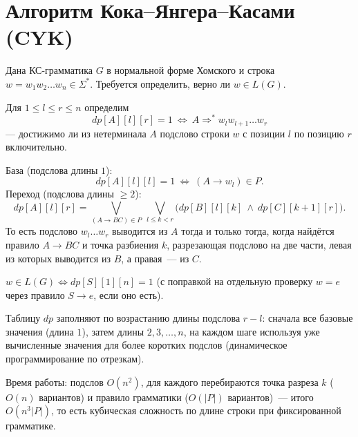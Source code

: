 \documentclass[12pt]{article}
\begin{document}
    \section{Алгоритм Кока--Янгера--Касами (CYK)}
    
    \begin{definition}
    	Дана КС-грамматика $G$ в нормальной форме Хомского и строка $w = w_1w_2\ldots w_n \in \Sigma^*$. Требуется определить, верно ли $w \in L(G)$.
    \end{definition}
    
    \begin{definition}
    	Для $1 \leqslant l \leqslant r \leqslant n$ определим
    	\[
    	dp[A][l][r] = 1 \ \Longleftrightarrow\ A \Rightarrow^* w_l w_{l+1} \ldots w_r
    	\]
    	--- достижимо ли из нетерминала $A$ подслово строки $w$ с позиции $l$ по позицию $r$ включительно.
    \end{definition}
    
    \begin{statement}
    	База (подслова длины $1$):
    	\[
    	dp[A][l][l] = 1 \ \Longleftrightarrow\ (A \rightarrow w_l) \in P.
    	\]
    	Переход (подслова длины $\geqslant 2$):
    	\[
    	dp[A][l][r] = \bigvee_{(A \rightarrow BC) \in P} \ \bigvee_{l \leqslant k < r} \bigl( dp[B][l][k] \ \wedge\ dp[C][k+1][r] \bigr).
    	\]
    	То есть подслово $w_l \ldots w_r$ выводится из $A$ тогда и только тогда, когда найдётся правило $A \rightarrow BC$ и точка разбиения $k$, разрезающая подслово на две части, левая из которых выводится из $B$, а правая~--- из $C$.
    \end{statement}
    
    \begin{corollary}
    	$w \in L(G) \Longleftrightarrow dp[S][1][n] = 1$ (с поправкой на отдельную проверку $w = e$ через правило $S \rightarrow e$, если оно есть).
    \end{corollary}
    
    \begin{method}
    	Таблицу $dp$ заполняют по возрастанию длины подслова $r - l$: сначала все базовые значения (длина $1$), затем длины $2, 3, \ldots, n$, на каждом шаге используя уже вычисленные значения для более коротких подслов (динамическое программирование по отрезкам).
    	
    	Время работы: подслов $O(n^2)$, для каждого перебираются точка разреза $k$ ($O(n)$ вариантов) и правило грамматики ($O(|P|)$ вариантов)~--- итого $O(n^3 |P|)$, то есть кубическая сложность по длине строки при фиксированной грамматике.
    \end{method}
    
\end{document}
